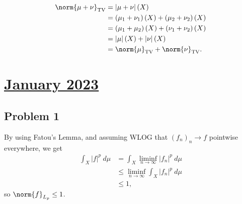 \documentclass[10pt]{mypackage}
\begin{document}
\begin{enumerate}[(a)]
    \begin{align*}
      \norm{\mu+\nu}_{\text{TV}} &= \left\vert \mu + \nu \right\vert(X)\\
                                                      &= \left( \mu_1 + \nu_1 \right)(X) + \left( \mu_2 + \nu_2 \right)(X)\\
                                          &= \left( \mu_1 + \mu_2 \right)(X) + \left( \nu_1 + \nu_2 \right)(X)\\
                                          &= \left\vert \mu \right\vert(X) + \left\vert \nu \right\vert(X)\\
                                          &= \norm{\mu}_{\text{TV}} + \norm{\nu}_{\text{TV}}.
    \end{align*}
    
\end{enumerate}
\section{\href{https://math.virginia.edu/graduate/exams/analysis/2023Jan_real.pdf}{January 2023}}%
\subsection{Problem 1}%
By using Fatou's Lemma, and assuming WLOG that $\left( f_n \right)_n\rightarrow f$ pointwise everywhere, we get
\begin{align*}
  \int_{X}^{} \left\vert f \right\vert^{p}\:d\mu &= \int_{X}^{} \liminf_{n\rightarrow\infty} \left\vert f_n \right\vert^{p}\:d\mu\\
                                                 &\leq \liminf_{n\rightarrow\infty} \int_{X}^{} \left\vert f_n \right\vert^{p}\:d\mu\\
                                                 &\leq 1,
\end{align*}
so $\norm{f}_{L_p}\leq 1$.
\end{document}
